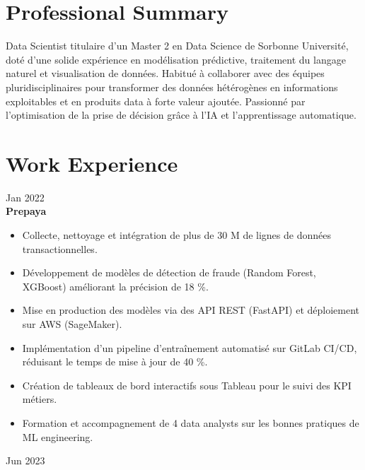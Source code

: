 \documentclass[10pt,letterpaper]{article}
\begin{document}
\begin{paracol}{2}
\begin{rightcolumn}
\section*{Professional Summary}
Data Scientist titulaire d’un Master 2 en Data Science de Sorbonne Université, doté d’une solide expérience en modélisation prédictive, traitement du langage naturel et visualisation de données. Habitué à collaborer avec des équipes pluridisciplinaires pour transformer des données hétérogènes en informations exploitables et en produits data à forte valeur ajoutée. Passionné par l’optimisation de la prise de décision grâce à l’IA et l’apprentissage automatique.

\vspace{1in}
\section*{Work Experience}

\begin{tcolorbox}
  \begin{minipage}[t]{0.48\linewidth}
    Jan 2022\\
    \textbf{Prepaya}\\
    \begin{itemize}
      \item Collecte, nettoyage et intégration de plus de 30 M de lignes de données transactionnelles.
      \item Développement de modèles de détection de fraude (Random Forest, XGBoost) améliorant la précision de 18 \%.
      \item Mise en production des modèles via des API REST (FastAPI) et déploiement sur AWS (SageMaker).
      \item Implémentation d’un pipeline d’entraînement automatisé sur GitLab CI/CD, réduisant le temps de mise à jour de 40 \%.
      \item Création de tableaux de bord interactifs sous Tableau pour le suivi des KPI métiers.
      \item Formation et accompagnement de 4 data analysts sur les bonnes pratiques de ML engineering.
    \end{itemize}
  \end{minipage}\hfill
  \begin{minipage}[t]{0.48\linewidth}\raggedleft
    Jun 2023
  \end{minipage}
\end{tcolorbox}


\end{rightcolumn}
\end{paracol}
\end{document}
